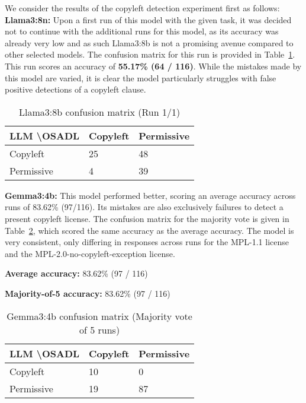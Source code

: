We consider the results of the copyleft detection experiment first as follows: \\

\textbf{Llama3:8n:} Upon a first run of this model with the given task, it was decided not to continue with the additional runs for this model, as its accuracy was already very low and as such Llama3:8b is not a promising avenue compared to other selected models. The confusion matrix for this run is provided in Table~\ref{tab:llama3-1-confmatrix}. This run scores an accuracy of \textbf{55.17\% (64 / 116)}. While the mistakes made by this model are varied, it is clear the model particularly struggles with false positive detections of a copyleft clause.

\begin{table}[h]
	\caption{Llama3:8b confusion matrix (Run 1/1)}
	\label{tab:llama3-1-confmatrix}
	\centering
	\begin{tabular}{l|ll}
		\hline
		\textbf{LLM \textbackslash OSADL} & Copyleft & Permissive \\ \hline
		Copyleft & 25 & 48 \\
		Permissive & 4 & 39 \\\hline
	\end{tabular}
\end{table}

\textbf{Gemma3:4b:} This model performed better, scoring an average accuracy across runs of 83.62\% (97/116). Its mistakes are also exclusively failures to detect a present copyleft license. The confusion matrix for the majority vote is given in Table~\ref{tab:gemma3-confmatrix}, which scored the same accuracy as the average accuracy. The model is very consistent, only differing in responses across runs for the MPL-1.1 license and the MPL-2.0-no-copyleft-exception license.

\textbf{Average accuracy:} 83.62\% (97 / 116)

\textbf{Majority-of-5 accuracy:} 83.62\% (97 / 116)

\begin{table}[h]
	\caption{Gemma3:4b confusion matrix (Majority vote of 5 runs)}
	\label{tab:gemma3-confmatrix}
	\centering
	\begin{tabular}{l|ll}
		\hline
		\textbf{LLM \textbackslash OSADL} & Copyleft & Permissive \\ \hline
		Copyleft & 10 & 0 \\
		Permissive & 19 & 87 \\\hline
	\end{tabular}
\end{table}

